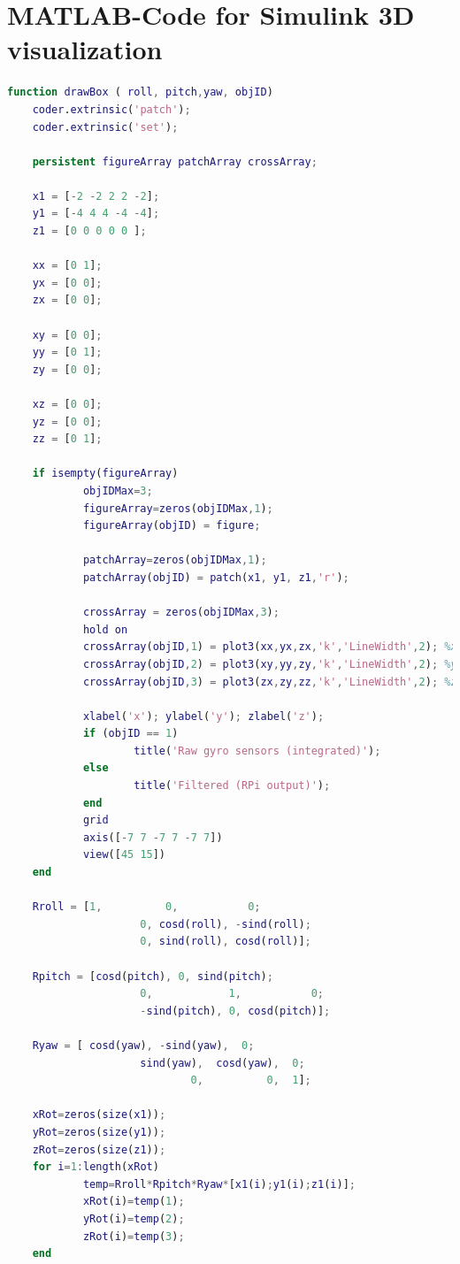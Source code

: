 \section{MATLAB-Code for Simulink 3D visualization}
\label{sec:d-mFunc-Code}

\begin{lstlisting}[caption={[MATLAB-Code for 3D visualization of orientation angles]MATLAB-Code for a MATLAB-function block to realize a 3D visualization of the Quadrocopter's orientation angles},language=MATLAB,label=code:d-mFunc-Code:3dViz]
function drawBox ( roll, pitch,yaw, objID)
	coder.extrinsic('patch');
	coder.extrinsic('set');

	persistent figureArray patchArray crossArray;

	x1 = [-2 -2 2 2 -2]; 
	y1 = [-4 4 4 -4 -4]; 
	z1 = [0 0 0 0 0 ]; 

	xx = [0 1]; 
	yx = [0 0]; 
	zx = [0 0];

	xy = [0 0]; 
	yy = [0 1]; 
	zy = [0 0];

	xz = [0 0]; 
	yz = [0 0]; 
	zz = [0 1];

	if isempty(figureArray)
			objIDMax=3;
			figureArray=zeros(objIDMax,1);
			figureArray(objID) = figure;
			
			patchArray=zeros(objIDMax,1);
			patchArray(objID) = patch(x1, y1, z1,'r');

			crossArray = zeros(objIDMax,3);
			hold on
			crossArray(objID,1) = plot3(xx,yx,zx,'k','LineWidth',2); %x
			crossArray(objID,2) = plot3(xy,yy,zy,'k','LineWidth',2); %y
			crossArray(objID,3) = plot3(zx,zy,zz,'k','LineWidth',2); %z
					
			xlabel('x'); ylabel('y'); zlabel('z');
			if (objID == 1)
					title('Raw gyro sensors (integrated)');
			else
					title('Filtered (RPi output)');
			end
			grid
			axis([-7 7 -7 7 -7 7])
			view([45 15])
	end

	Rroll = [1,          0,           0;
					 0, cosd(roll), -sind(roll);
					 0, sind(roll), cosd(roll)];
					
	Rpitch = [cosd(pitch), 0, sind(pitch);
					 0,            1,           0;
					 -sind(pitch), 0, cosd(pitch)];
					
	Ryaw = [ cosd(yaw), -sind(yaw),  0;
					 sind(yaw),  cosd(yaw),  0;
					         0,          0,  1];

	xRot=zeros(size(x1));
	yRot=zeros(size(y1));
	zRot=zeros(size(z1));
	for i=1:length(xRot)
			temp=Rroll*Rpitch*Ryaw*[x1(i);y1(i);z1(i)];
			xRot(i)=temp(1);
			yRot(i)=temp(2);
			zRot(i)=temp(3);
	end


\end{lstlisting}
